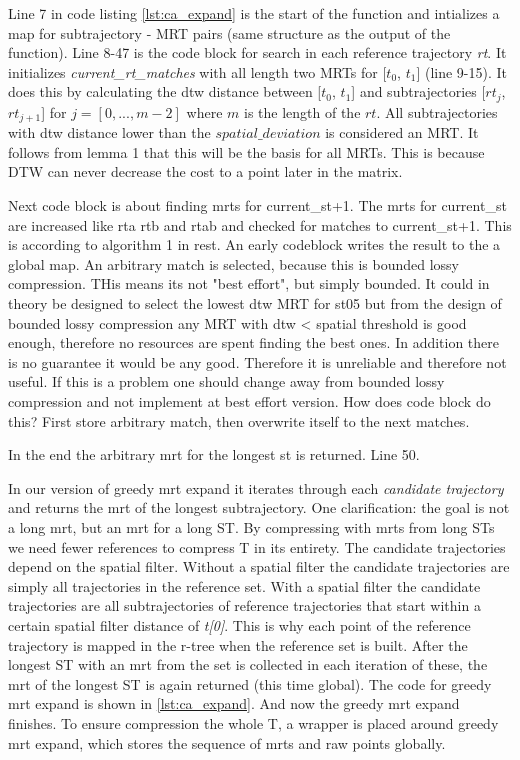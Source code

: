 Line 7 in code listing \ref{lst:ca_expand} is the start of the function and intializes a map for subtrajectory - MRT pairs (same structure as the output of the function). Line 8-47 is the code block for search in each reference trajectory \textit{rt}. It initializes \textit{current\_rt\_matches} with all length two MRTs for [$t_0$, $t_1$] (line 9-15). It does this by calculating the dtw distance between [$t_0$, $t_1$] and subtrajectories [$rt_j$, $rt_{j+1}$] for $j = [0, ..., m-2]$ where $m$ is the length of the $rt$. All subtrajectories with dtw distance lower than the $spatial\_deviation$ is considered an MRT. It follows from lemma 1 that this will be the basis for all MRTs. This is because DTW can never decrease the cost to a point later in the matrix.

Next code block is about finding mrts for current\_st+1. The mrts for current\_st are increased like rta rtb and rtab and checked for matches to current\_st+1. This is according to algorithm 1 in rest. An early codeblock writes the result to the a global map. An arbitrary match is selected, because this is bounded lossy compression. THis means its not "best effort", but simply bounded. It could in theory be designed to select the lowest dtw MRT for st05 but from the design of bounded lossy compression any MRT with dtw < spatial threshold is good enough, therefore no resources are spent finding the best ones. In addition there is no guarantee it would be any good. Therefore it is unreliable and therefore not useful. If this is a problem one should change away from bounded lossy compression and not implement at best effort version. How does code block do this? First store arbitrary match, then overwrite itself to the next matches.

In the end the arbitrary mrt for the longest st is returned. Line 50.



In our version of greedy mrt expand it iterates through each \textit{candidate trajectory} and returns the \acrshort{mrt} of the longest subtrajectory. One clarification: the goal is not a long \acrshort{mrt}, but an \acrshort{mrt} for a long ST. By compressing with \acrshort{mrt}s from long STs we need fewer references to compress T in its entirety. The candidate trajectories depend on the spatial filter. Without a spatial filter the candidate trajectories are simply all trajectories in the reference set. With a spatial filter the candidate trajectories are all subtrajectories of reference trajectories that start within a certain spatial filter distance of \textit{t[0]}. This is why each point of the reference trajectory is mapped in the r-tree when the reference set is built. After the longest ST with an \acrshort{mrt} from the set is collected in each iteration of these, the \acrshort{mrt} of the longest ST is again returned (this time global). The code for greedy mrt expand is shown in \ref{lst:ca_expand}. And now the greedy mrt expand finishes. To ensure compression the whole T, a wrapper is placed around greedy mrt expand, which stores the sequence of \acrshort{mrt}s and raw points globally.

